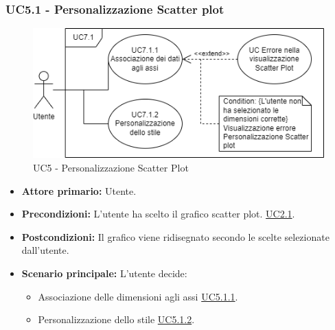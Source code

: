 \subsubsection{UC5.1 - Personalizzazione Scatter plot}
\label{sec:UC5.1}
\begin{figure}[h!]
	\centering
	\includegraphics[scale=0.50]{../../assets/personalizzazioneScatterPlot.drawio.png}
	\caption{UC5 - Personalizzazione Scatter Plot}
\end{figure}
\begin{itemize}
    \item \textbf{Attore primario:} Utente.
	\item \textbf{Precondizioni:} L'utente ha scelto il grafico scatter plot. \hyperref[sec:UC2.1]{UC2.1}.
	\item \textbf{Postcondizioni:} 
	Il grafico viene ridisegnato secondo le scelte selezionate dall'utente.
	\item \textbf{Scenario principale:} L'utente decide:
	\begin{itemize}
        \item Associazione delle dimensioni agli assi \hyperref[sec:UC5.1.1]{UC5.1.1}.
        \item Personalizzazione dello stile \hyperref[sec:UC5.1.2]{UC5.1.2}.
    \end{itemize}
\end{itemize}
